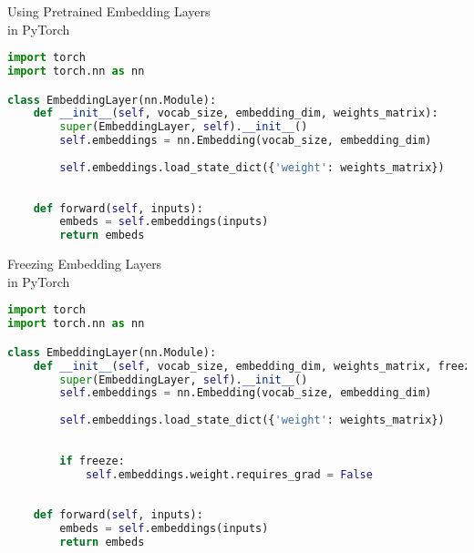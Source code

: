  \begin{frame}[fragile]{Using Pretrained Embedding Layers  \\ in PyTorch}
  \tiny
     \begin{lstlisting}[language=Python]
import torch
import torch.nn as nn

class EmbeddingLayer(nn.Module):
    def __init__(self, vocab_size, embedding_dim, weights_matrix):
        super(EmbeddingLayer, self).__init__()
        self.embeddings = nn.Embedding(vocab_size, embedding_dim)
        
        self.embeddings.load_state_dict({'weight': weights_matrix})
    
     
    def forward(self, inputs):
        embeds = self.embeddings(inputs)
        return embeds
\end{lstlisting}
 \end{frame}
 
 \begin{frame}[fragile]{Freezing Embedding Layers \\ in PyTorch}
 
  \tiny
     \begin{lstlisting}[language=Python]
import torch
import torch.nn as nn

class EmbeddingLayer(nn.Module):
    def __init__(self, vocab_size, embedding_dim, weights_matrix, freeze=False):
        super(EmbeddingLayer, self).__init__()
        self.embeddings = nn.Embedding(vocab_size, embedding_dim)
        
        self.embeddings.load_state_dict({'weight': weights_matrix})
        
        
        if freeze:
            self.embeddings.weight.requires_grad = False
        
        
    def forward(self, inputs):
        embeds = self.embeddings(inputs)
        return embeds
\end{lstlisting}
 \end{frame}
 
